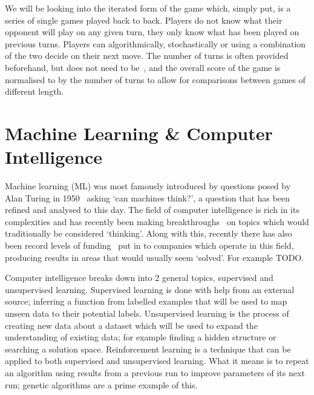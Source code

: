 We will be looking into the iterated form of the game which, simply put, is a series of single games played back to back. 
Players do not know what their opponent will play on any given turn, they only know what has been played on previous turns.
Players can algorithmically, stochastically or using a combination of the two decide on their next move.
The number of turns is often provided beforehand, but does not need to be~\cite{axelrod1980more}, and the overall score of the game is normalised to by the number of turns to allow for comparisons between games of different length.

\section{Machine Learning \& Computer Intelligence}\label{sec:machineLearningAndcomputerIntelligence}
Machine learning (ML) was most famously introduced by questions posed by Alan Turing in 1950~\cite{turing1950computing} asking `can machines think?', a question that has been refined and analysed to this day.
The field of computer intelligence is rich in its complexities and has recently been making breakthroughs~\cite{knight2017alphaZeroMIT} on topics which would traditionally be considered `thinking'.
Along with this, recently there has also been record levels of funding~\cite{chui2017artificial} put in to companies which operate in this field, producing results in areas that would usually seem `solved'. 
For example TODO.

Computer intelligence breaks down into 2 general topics, supervised and unsupervised learning.
Supervised learning is done with help from an external source; inferring a function from labelled examples that will be used to map unseen data to their potential labels.
Unsupervised learning is the process of creating new data about a dataset which will be used to expand the understanding of existing data; for example finding a hidden structure or searching a solution space.
Reinforcement learning is a technique that can be applied to both supervised and unsupervised learning.
What it means is to repeat an algorithm using results from a previous run to improve parameters of its next run; genetic algorithms are a prime example of this.


